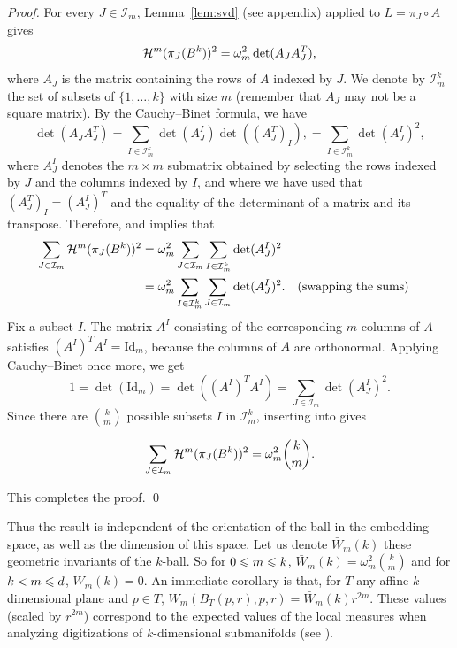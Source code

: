 \begin{proof}
For every $J \in \mathcal{I}_m$, Lemma~\ref{lem:svd} (see appendix) applied
to $L=\pi_J\circ A$ gives
\begin{equation}
  \label{eq-vol-proj-ball-1}
  \mathcal{H}^m(\pi_J( B^k ))^2
  =\omega_m^2 \det(A_J A_J^T),
\end{equation}
where $A_J$ is the matrix containing the rows of $A$ indexed by
$J$. We denote by $\mathcal{I}^k_m$ the set of subsets of
$\{1,\dots,k\}$ with size $m$ (remember that $A_J$ may not be a square
matrix).  By the Cauchy--Binet formula, we have
\begin{equation}
  \label{eq-cauchy-binet-1}
\det(A_J A_J^T)
=
\sum_{I \in \mathcal{I}^k_m}
\det(A_J^I) \det( (A_J^T)_I ),
=
\sum_{I \in \mathcal{I}^k_m}
\det(A_J^I)^2,
\end{equation}
where $A_J^I$ denotes the $m\times m$ submatrix obtained by selecting
the rows indexed by $J$ and the columns indexed by $I$, and where we
have used that $(A_J^T)_I = (A_J^I)^T$ and the equality of the
determinant of a matrix and its transpose.
Therefore,  and  implies that
\begin{align}
  \sum_{J \in \mathcal{I}_m}
  \mathcal{H}^m(\pi_J(B^k))^2
  & =
  \omega_m^2
  \sum_{J \in \mathcal{I}_m}
  \sum_{I \in \mathcal{I}^k_m}
  \det(A_J^I)^2
  \nonumber \\
  \label{eq-proj-vol-ball-2}
  & =
  \omega_m^2
  \sum_{I \in \mathcal{I}^k_m}
  \sum_{J \in \mathcal{I}_m}
  \det(A_J^I)^2.
  && \text{(swapping the sums)}
\end{align}
Fix a subset $I$. The matrix $A^I$ consisting of the corresponding $m$
columns of $A$ satisfies $(A^I)^T A^I=\mathrm{Id}_m$, because the
columns of $A$ are orthonormal.
Applying Cauchy--Binet once more, we get
\begin{equation}
  \label{eq-cauchy-binet-2}
  1 = \det(\mathrm{Id}_m) = \det((A^I)^T A^I) = \sum_{J \in \mathcal{I}_m} \det(A_J^I)^2.
\end{equation}
Since there are $\binom{k}{m}$ possible subsets $I$ in $\mathcal{I}^k_m$, inserting  into  gives

\[
\sum_{J \in \mathcal{I}_m}
\mathcal{H}^m(\pi_J(B^k))^2
=
\omega_m^2
\binom{k}{m}.
\]

This completes the proof. \qed
\end{proof}
Thus the result is independent of the orientation of the ball in the
embedding space, as well as the dimension of this space. Let us denote
$\bar{W}_{m}(k)$ these geometric invariants of the $k$-ball. So for $0
\leqslant m \leqslant k$, $\bar{W}_{m}(k)=\omega_m^2\binom{k}{m}$ and for $k < m
\leqslant d$, $\bar{W}_{m}(k)=0$.  An immediate corollary is that, for $T$
any affine $k$-dimensional plane and $p \in T$, $W_m( B_T(p,r),p,r) =
\bar{W}_{m}(k) r^{2m}$.  These values (scaled by $r^{2m}$) correspond
to the expected values of the local measures when analyzing
digitizations of $k$-dimensional submanifolds (see
).

